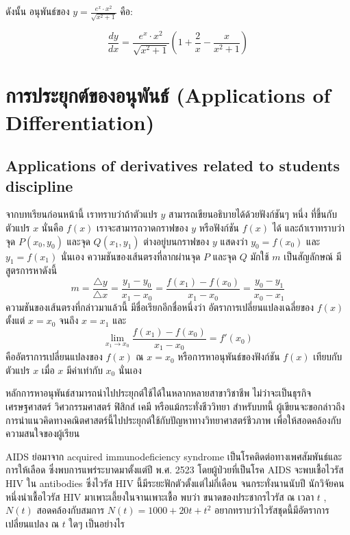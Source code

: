 \documentclass[
]{book}
\begin{document}
ดังนั้น อนุพันธ์ของ \(y = \frac{e^x \cdot x^2}{\sqrt{x^2 + 1}}\) คือ:

\[ \boxed{\frac{dy}{dx} = \frac{e^x \cdot x^2}{\sqrt{x^2 + 1}} \left( 1 + \frac{2}{x} - \frac{x}{x^2 + 1} \right)} \]

\chapter{การประยุกต์ของอนุพันธ์ (Applications of
Differentiation)}\label{uxe01uxe32uxe23uxe1buxe23uxe30uxe22uxe01uxe15uxe02uxe2duxe07uxe2duxe19uxe1euxe19uxe18-applications-of-differentiation}

\section{Applications of derivatives related to students
discipline}\label{applications-of-derivatives-related-to-students-discipline}

จากบทเรียนก่อนหน้านี้ เราทราบว่าถ้าตัวแปร \(y\) สามารถเขียนอธิบายได้ด้วยฟังก์ชันๆ หนึ่ง
ที่ขึ้นกับตัวแปร \(x\) นั่นคือ \(f(x)\) เราจะสามารถวาดกราฟของ \(y\) หรือฟังก์ชัน
\(f(x)\) ได้ และถ้าเราทราบว่า จุด \(P(x_0,y_0)\) และจุด \(Q(x_1,y_1)\)
ต่างอยู่บนกราฟของ \(y\) แสดงว่า \(y_0=f(x_0)\) และ \(y_1=f(x_1)\) นั่นเอง
ความชันของเส้นตรงที่ลากผ่านจุด \(P\) และจุด \(Q\) มักใช้ \(m\) เป็นสัญลักษณ์
มีสูตรการหาดังนี้
\[m=\frac{\triangle y}{\triangle x}=\frac{y_1-y_0}{ x_1-x_0}=\frac{f(x_1)-f(x_0)}{ x_1-x_0}=\frac{y_0-y_1}{ x_0-x_1}\]
ความชันของเส้นตรงที่กล่าวมาแล้วนี้ มีชื่อเรียกอีกชื่อหนึ่งว่า อัตราการเปลี่ยนแปลงเฉลี่ยของ
\(f(x)\) ตั้งแต่ \(x=x_0\) จนถึง \(x=x_1\) และ
\[\lim_{x_1 \rightarrow x_0} \frac{f(x_1)-f(x_0)}{ x_1-x_0} =f'(x_0)\]
คืออัตราการเปลี่ยนแปลงของ \(f(x)\) ณ \(x=x_0\) หรือการหาอนุพันธ์ของฟังก์ชัน
\(f(x)\) เทียบกับตัวแปร \(x\) เมื่อ \(x\) มีค่าเท่ากับ \(x_0\) นั่นเอง

หลักการหาอนุพันธ์สามารถนำไปประยุกต์ใช้ได้ในหลากหลายสาขาวิชาชีพ ไม่ว่าจะเป็นธุรกิจ
เศรษฐศาสตร์ วิศวกรรมศาสตร์ ฟิสิกส์ เคมี หรือแม้กระทั่งชีววิทยา สำหรับบทนี้
ผู้เขียนจะขอกล่าวถึง การนำแนวคิดทางคณิตศาสตร์นี้ไปประยุกต์ใช้กับปัญหาทางวิทยาศาสตร์ชีวภาพ
เพื่อให้สอดคล้องกับความสนใจของผู้เรียน

AIDS ย่อมาจาก acquired immunodeficiency syndrome
เป็นโรคติดต่อทางเพศสัมพันธ์และการให้เลือด ซึ่งพบการแพร่ระบาดมาตั้งแต่ปี พ.ศ. 2523
โดยผู้ป่วยที่เป็นโรค AIDS จะพบเชื้อไวรัส HIV ใน antibodies ซึ่งไวรัส HIV
นี้มีระยะฟักตัวตั้งแต่ไม่กี่เดือน จนกระทั่งนานนับปี นักวิจัยคนหนึ่งนำเชื้อไวรัส HIV
มาเพาะเลี้ยงในจานเพาะเชื้อ พบว่า ขนาดของประชากรไวรัส ณ เวลา \(t\) , \(N(t)\)
สอดคล้องกับสมการ \(N(t)=1000+20t+t^2\) อยากทราบว่าไวรัสชุดนี้มีอัตราการเปลี่ยนแปลง
ณ \(t\) ใดๆ เป็นอย่างไร
\end{document}
